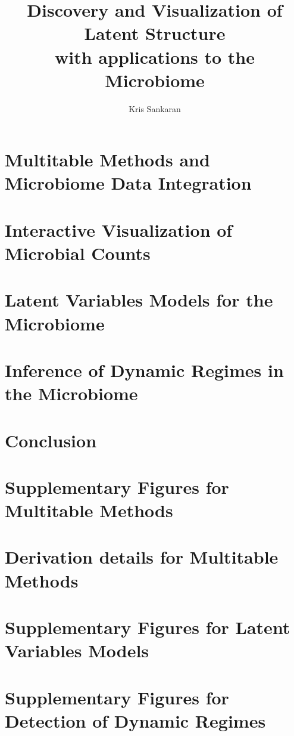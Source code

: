\documentclass{report}
\title{Discovery and Visualization of Latent Structure \\ with applications to
  the Microbiome}
\author{Kris Sankaran}
\begin{document}
\maketitle
\tableofcontents

\chapter{Multitable Methods and Microbiome Data Integration}
\label{ch:multitable}


\chapter{Interactive Visualization of Microbial Counts}
\label{ch:interactive_vis}


\chapter{Latent Variables Models for the Microbiome}
\label{ch:text_analysis}


\chapter{Inference of Dynamic Regimes in the Microbiome}
\label{ch:dynamic_regimes}


\chapter{Conclusion}

\appendix
\chapter{Supplementary Figures for Multitable Methods}
\label{ch:multitable_supp_figs}


\chapter{Derivation details for Multitable Methods}
\label{ch:multitable_supp_derivations}


\chapter{Supplementary Figures for Latent Variables Models}
\label{ch:lvm_supp_figures}


\chapter{Supplementary Figures for Detection of Dynamic Regimes}
\label{ch:dynamic_regimes_supp}




\end{document}
